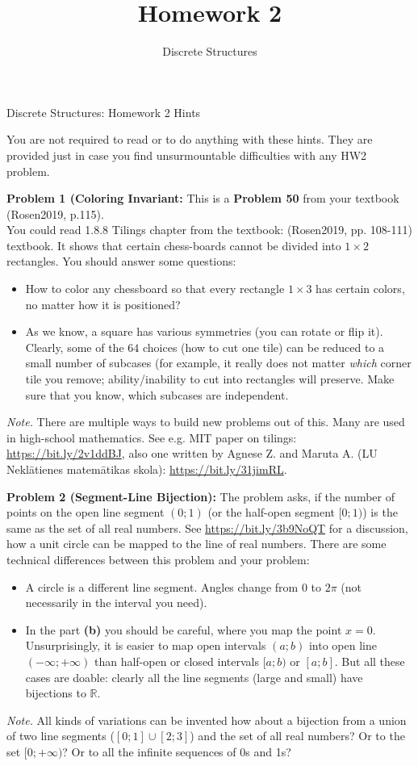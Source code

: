 \documentclass[jou]{apa6}
\title{Homework 2}
\author{Discrete Structures}
\affiliation{RBS}
\begin{document}


\thispagestyle{empty}

\twocolumn
{\Large Discrete Structures: Homework 2 Hints}

You are not required to read or to do anything with these hints. They 
are provided just in case you find unsurmountable difficulties with any HW2 problem.


\vspace{2ex}
{\bf Problem 1 (Coloring Invariant:} This is a {\bf Problem 50} from your textbook (Rosen2019, p.115).\\
You could read 1.8.8 Tilings chapter
from the textbook: (Rosen2019, pp. 108-111) textbook. It shows that certain chess-boards
cannot be divided into $1 \times 2$ rectangles. You should answer some questions:
\begin{itemize}
\item How to color any chessboard so that every rectangle $1 \times 3$ has certain colors, 
no matter how it is positioned?
\item As we know, a square has various symmetries (you can rotate or flip it). Clearly, 
some of the $64$ choices (how to cut one tile) can be reduced to a small number of subcases (for example, 
it really does not matter {\em which} corner tile you remove; ability/inability to cut into rectangles will 
preserve. Make sure that you know, which subcases are independent. 
\end{itemize}
{\em Note.} There are multiple ways to build new problems out of this. Many are used in high-school mathematics.
See e.g. MIT paper on tilings: \url{https://bit.ly/2v1ddBJ}, also one written by Agnese Z. and Maruta A. 
(LU Nekl\={a}tienes matem\={a}tikas skola): \url{https://bit.ly/31jimRL}.


\vspace{2ex}
{\bf Problem 2 (Segment-Line Bijection):} The problem asks, if the number of points on the open line segment 
$(0;1)$ (or the half-open segment $[0;1)$) is the same as the set of all real numbers. 
See \url{https://bit.ly/3b9NoQT} for a discussion, how a unit circle can be mapped to 
the line of real numbers. There are some technical differences between this problem and your problem:
\begin{itemize}
\item A circle is a different line segment. Angles change from $0$ to $2\pi$ (not necessarily 
in the interval you need). 
\item In the part {\bf (b)} you should be careful, where you map the point $x = 0$. 
Unsurprisingly, it is easier to map open intervals $(a;b)$ into open 
line $(-\infty;+\infty)$ than half-open or closed intervals $[a;b)$ or $[a;b]$.
But all these cases are doable: clearly all the line segments (large and small) have bijections to $\mathbb{R}$.
\end{itemize}
{\em Note.} All kinds of variations can be invented \textendash{} how about a bijection
from a union of two line segments ($[0;1] \cup [2;3]$) and the set of all real numbers? 
Or to the set $[0;+\infty)$? Or to all the infinite sequences of 0s and 1s?
\end{document}
